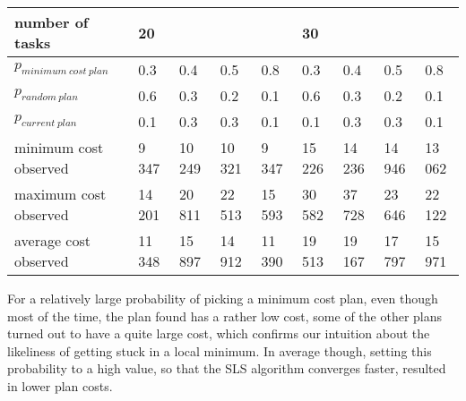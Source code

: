 \documentclass[10pt]{article}
\begin{document}
\begin{tabular}{|l|llll|llll|}
\hline
number of tasks & 20 & & & & 30 & & & \\
\hline
$p_{minimum\ cost\ plan}$ & 0.3 & 0.4 & 0.5 & 0.8 & 0.3 & 0.4 & 0.5 & 0.8\\
$p_{random\ plan}$        & 0.6 & 0.3 & 0.2 & 0.1 & 0.6 & 0.3 & 0.2 & 0.1\\
$p_{current\ plan}$       & 0.1 & 0.3 & 0.3 & 0.1 & 0.1 & 0.3 & 0.3 & 0.1\\
\hline
minimum cost observed & 9 347 &  10 249 & 10 321 & 9 347  &  15 226 & 14 236 & 14 946 & 13 062 \\
maximum cost observed & 14 201 & 20 811 & 22 513 & 15 593  &  30 582 & 37 728 & 23 646 & 22 122\\
\hline
average cost observed & 11 348 & 15 897 & 14 912 & 11 390 & 19 513 & 19 167 & 17 797 & 15 971 \\
\hline
\end{tabular}
\label{table:model_parameters}
\vspace{4mm}




For a relatively large probability of picking a minimum cost plan, even though most of the time, the plan found has a rather low cost, some of the other plans turned out to have a quite large cost, which confirms our intuition about the likeliness of getting stuck in a local minimum. 
In average though, setting this probability to a high value, so that the SLS algorithm converges faster, resulted in lower plan costs.
\end{document}
